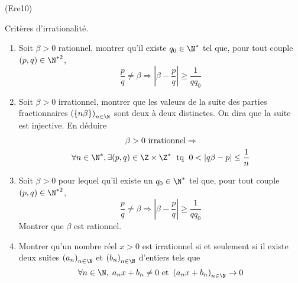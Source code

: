 \begin{tiny}(Ere10)\end{tiny} Critères d'irrationalité.
\begin{enumerate}
 \item Soit $\beta >0$ rationnel, montrer qu'il existe $q_0\in \N^*$ tel que, pour tout couple $(p,q)\in \N^{*2}$,
\begin{displaymath}
 \frac{p}{q}\neq \beta \Rightarrow \left| \beta - \frac{p}{q}\right| \geq \frac{1}{qq_0}
\end{displaymath}
 \item Soit $\beta >0$ irrationnel, montrer que les valeurs de la suite des parties fractionnaires $\left( \{n\beta\} \right) _{n\in \N}$ sont deux à deux distinctes. On dira que la suite est injective. En déduire
\begin{multline*}
\beta > 0 \text{ irrationnel} \Rightarrow \\
\forall n \in \N^*, \exists(p,q)\in \Z\times \Z^*\; \text{ tq }\; 0 < \left| q\beta - p\right| \leq \frac{1}{n}
\end{multline*}
 \item Soit $\beta >0$ pour lequel qu'il existe un $q_0\in \N^*$ tel que, pour tout couple $(p,q)\in \N^{*2}$,
\begin{displaymath}
 \frac{p}{q}\neq \beta \Rightarrow \left| \beta - \frac{p}{q}\right| \geq \frac{1}{qq_0}
\end{displaymath}
Montrer que $\beta$ est rationnel.
\item Montrer qu'un nombre réel $x>0$ est irrationnel si et seulement si il existe deux suites $\left( a_n\right) _{n\in \N}$ et $\left( b_n\right) _{n\in \N}$ d'entiers tels que
\begin{displaymath}
 \forall n \in \N,\; a_nx+b_n \neq 0 \text{ et }
 \left( a_nx + b_n \right) _{n\in \N} \rightarrow 0
\end{displaymath}

\end{enumerate}
